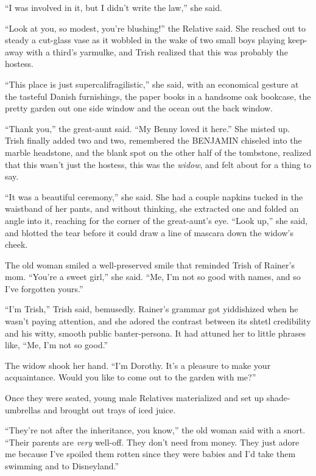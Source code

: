 “I was involved in it, but I didn't write the law,” she said.

“Look at you, so modest, you're blushing!” the Relative said. She 
reached out to steady a cut-glass vase as it wobbled in the wake of two 
small boys playing keep-away with a third's yarmulke, and Trish 
realized that this was probably the hostess.

“This place is just supercalifragilistic,” she said, with an 
economical gesture at the tasteful Danish furnishings, the paper books 
in a handsome oak bookcase, the pretty garden out one side window and 
the ocean out the back window.

“Thank you,” the great-aunt said. “My Benny loved it here.” She 
misted up. Trish finally added two and two, remembered the BENJAMIN 
chiseled into the marble headstone, and the blank spot on the other 
half of the tombstone, realized that this wasn't just the hostess, this 
was the \emph{widow}, and felt about for a thing to say.

“It was a beautiful ceremony,” she said. She had a couple napkins 
tucked in the waistband of her pants, and without thinking, she 
extracted one and folded an angle into it, reaching for the corner of 
the great-aunt's eye. “Look up,” she said, and blotted the tear 
before it could draw a line of mascara down the widow's cheek.

The old woman smiled a well-preserved smile that reminded Trish of 
Rainer's mom. “You're a sweet girl,” she said. “Me, I'm not so 
good with names, and so I've forgotten yours.”

“I'm Trish,” Trish said, bemusedly. Rainer's grammar got 
yiddishized when he wasn't paying attention, and she adored the 
contrast between its shtetl credibility and his witty, smooth public 
ban\-ter-persona. It had attuned her to little phrases like, “Me, I'm 
not so good.”

The widow shook her hand. “I'm Dorothy. It's a pleasure to make your 
acquaintance. Would you like to come out to the garden with me?”

\tb

Once they were seated, young male Relatives materialized and set up 
shade-umbrellas and brought out trays of iced juice.

“They're not after the inheritance, you know,” the old woman said 
with a snort. “Their parents are \emph{very} well-off. They don't 
need from money. They just adore me because I've spoiled them rotten 
since they were babies and I'd take them swimming and to Disneyland.”

